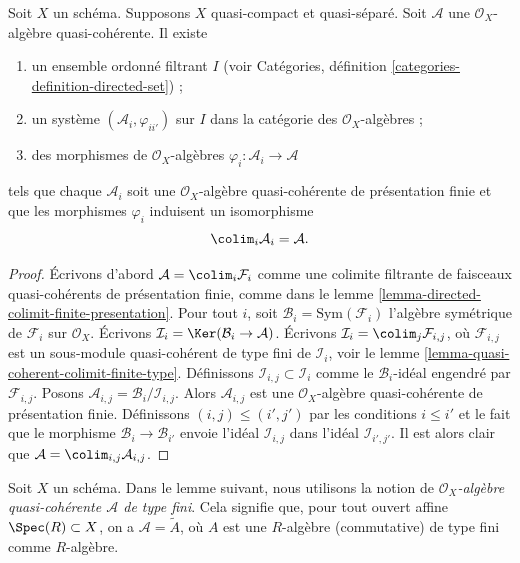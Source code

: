 \begin{lemma}
\label{lemma-algebra-directed-colimit-finite-presentation}
Soit $X$ un schéma. Supposons $X$ quasi-compact et quasi-séparé.
Soit $\mathcal{A}$ une $\mathcal{O}_X$-algèbre
quasi-cohérente. Il existe
\begin{enumerate}
\item un ensemble ordonné filtrant $I$ (voir
Catégories, définition \ref{categories-definition-directed-set}) ;
\item un système $(\mathcal{A}_i, \varphi_{ii'})$
sur $I$ dans la catégorie des $\mathcal{O}_X$-algèbres ;
\item des morphismes de $\mathcal{O}_X$-algèbres
$\varphi_i : \mathcal{A}_i \to \mathcal{A}$
\end{enumerate}
tels que chaque $\mathcal{A}_i$ soit une $\mathcal{O}_X$-algèbre
quasi-cohérente de présentation finie et que les morphismes $\varphi_i$
induisent un isomorphisme
$$
\colim_i \mathcal{A}_i
=
\mathcal{A}.
$$
\end{lemma}

\begin{proof}
Écrivons d'abord $\mathcal{A} = \colim_i \mathcal{F}_i$ comme une
colimite filtrante de faisceaux quasi-cohérents de présentation finie, comme dans
le lemme \ref{lemma-directed-colimit-finite-presentation}.
Pour tout $i$, soit $\mathcal{B}_i = \text{Sym}(\mathcal{F}_i)$ l'algèbre
symétrique de $\mathcal{F}_i$ sur $\mathcal{O}_X$. Écrivons
$\mathcal{I}_i = \Ker(\mathcal{B}_i \to \mathcal{A})$. Écrivons
$\mathcal{I}_i = \colim_j \mathcal{F}_{i, j}$, où
$\mathcal{F}_{i, j}$ est un sous-module quasi-cohérent de type fini de
$\mathcal{I}_i$, voir
le lemme \ref{lemma-quasi-coherent-colimit-finite-type}.
Définissons $\mathcal{I}_{i, j} \subset \mathcal{I}_i$
comme le $\mathcal{B}_i$-idéal engendré par $\mathcal{F}_{i, j}$.
Posons $\mathcal{A}_{i, j} = \mathcal{B}_i/\mathcal{I}_{i, j}$.
Alors $\mathcal{A}_{i, j}$ est une
$\mathcal{O}_X$-algèbre quasi-cohérente de présentation finie. Définissons $(i, j) \leq (i', j')$ par les conditions
$i \leq i'$ et le fait que le morphisme $\mathcal{B}_i \to \mathcal{B}_{i'}$
envoie l'idéal $\mathcal{I}_{i, j}$ dans l'idéal $\mathcal{I}_{i', j'}$.
Il est alors clair que $\mathcal{A} = \colim_{i, j} \mathcal{A}_{i, j}$.
\end{proof}

\noindent
Soit $X$ un schéma. Dans le lemme suivant, nous utilisons la
notion de {\it  $\mathcal{O}_X$-algèbre quasi-cohérente $\mathcal{A}$
de type fini}. Cela signifie que, pour tout ouvert affine
$\Spec(R) \subset X$, on a $\mathcal{A} = \widetilde{A}$,
où $A$ est une $R$-algèbre (commutative) de type fini
comme $R$-algèbre.

